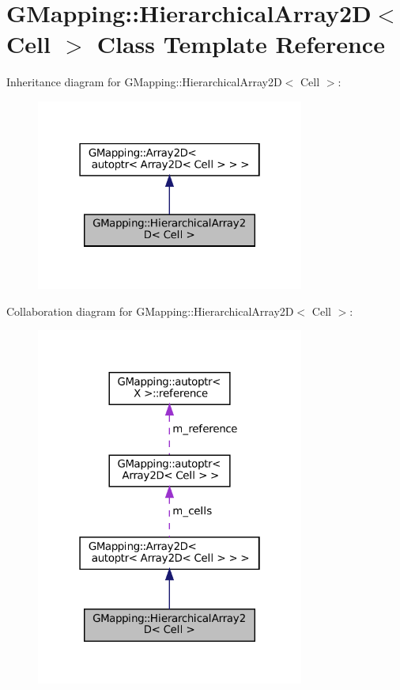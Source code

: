 \hypertarget{classGMapping_1_1HierarchicalArray2D}{}\section{G\+Mapping\+:\+:Hierarchical\+Array2D$<$ Cell $>$ Class Template Reference}
\label{classGMapping_1_1HierarchicalArray2D}


Inheritance diagram for G\+Mapping\+:\+:Hierarchical\+Array2D$<$ Cell $>$\+:
\nopagebreak
\begin{figure}[H]
\begin{center}
\leavevmode
\includegraphics[width=250pt]{classGMapping_1_1HierarchicalArray2D__inherit__graph}
\end{center}
\end{figure}


Collaboration diagram for G\+Mapping\+:\+:Hierarchical\+Array2D$<$ Cell $>$\+:
\nopagebreak
\begin{figure}[H]
\begin{center}
\leavevmode
\includegraphics[width=250pt]{classGMapping_1_1HierarchicalArray2D__coll__graph}
\end{center}
\end{figure}
